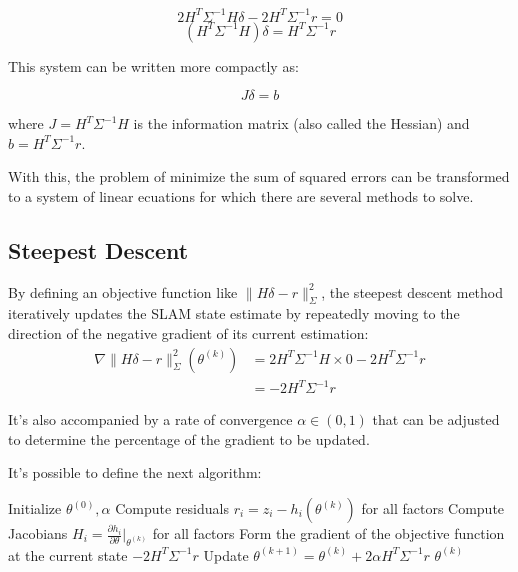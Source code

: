 \documentclass[journal]{IEEEtran}
\begin{document}
\[
2 H^T \Sigma^{-1} H \delta - 2 H^T \Sigma^{-1} r = 0 
\]
\begin{equation}
    (H^T \Sigma^{-1} H) \delta = H^T \Sigma^{-1} r
\end{equation}

This system can be written more compactly as:

\begin{equation}
    J \delta = b
\end{equation}

where $J = H^T \Sigma^{-1} H$ is the information matrix (also called the Hessian) and $b = H^T \Sigma^{-1} r$.

With this, the problem of minimize the sum of squared errors can be transformed to a system of linear ecuations for which there are several methods to solve. 

\subsection{Steepest Descent}
By defining an objective function like $\|H\delta - r\|^2_\Sigma$, the steepest descent method iteratively updates the SLAM state estimate by repeatedly moving to the direction of the negative gradient of its current estimation:
\[
\begin{aligned}
    \nabla \|H\delta - r\|^2_\Sigma(\theta^{(k)}) &= 2 H^T \Sigma^{-1} H \times 0 - 2 H^T \Sigma^{-1} r \\
    &= - 2 H^T \Sigma^{-1} r
\end{aligned}
\]

It's also accompanied by a rate of convergence $\alpha \in \left(0, 1\right)$ that can be adjusted to determine the percentage of the gradient to be updated.

It's possible to define the next algorithm:
\begin{algorithm}
\caption{Steepest descent for SLAM}
    \begin{algorithmic}[1]
    \STATE Initialize $\theta^{(0)}, \alpha$
        \STATE Compute residuals $r_i = z_i - h_i(\theta^{(k)})$ for all factors
        \STATE Compute Jacobians $H_i = \frac{\partial h_i}{\partial \theta}|_{\theta^{(k)}}$ for all factors
        \STATE Form the gradient of the objective function at the current state $ - 2 H^T \Sigma^{-1} r$ 
        \STATE Update $\theta^{(k+1)} = \theta^{(k)} + 2 \alpha H^T \Sigma^{-1} r$
    \ENDFOR
    \RETURN $\theta^{(k)}$
    \end{algorithmic}
\end{algorithm}
\end{document}
